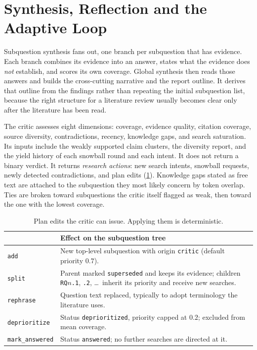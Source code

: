 \documentclass[10pt,a4paper]{article}
\newcommand{\hfont}{\sffamily}
\renewcommand{\paragraph}[1]{%
  \par\vspace{0.35em}{\hfont\bfseries\color{accent}#1}\hspace{0.6em}\ignorespaces}
\newcommand{\code}[1]{\texttt{#1}}
\newcommand{\headrow}{\rowcolor{tablehead}}
\newcommand{\tcol}[1]{{\hfont\bfseries\footnotesize\color{accent}#1}}
\begin{document}
\section{Synthesis, Reflection and the Adaptive Loop}
\label{sec:critic}

\paragraph{Synthesis.} Subquestion synthesis fans out, one branch per
subquestion that has evidence. Each branch combines its evidence into an
answer, states what the evidence does \emph{not} establish, and scores its
own coverage. Global synthesis then reads those answers and builds the
cross-cutting narrative and the report outline. It derives that outline
from the findings rather than repeating the initial subquestion list,
because the right structure for a literature review usually becomes clear
only after the literature has been read.

\paragraph{The critic.} The critic assesses eight dimensions: coverage,
evidence quality, citation coverage, source diversity, contradictions,
recency, knowledge gaps, and search saturation. Its inputs include the
weakly supported claim clusters, the diversity report, and the yield
history of each snowball round and each intent. It does not return a
binary verdict. It returns \emph{research actions}: new search intents,
snowball requests, newly detected contradictions, and plan edits
(\cref{tab:edits}). Knowledge gaps stated as free text are attached to the
subquestion they most likely concern by token overlap. Ties are broken
toward subquestions the critic itself flagged as weak, then toward the one
with the lowest coverage.

\begin{table}[t]
\centering
\small
\caption{Plan edits the critic can issue. Applying them is deterministic.}
\label{tab:edits}
\begin{tabularx}{\linewidth}{@{}lX@{}}
\toprule
\headrow \tcol{Edit} & \tcol{Effect on the subquestion tree} \\
\midrule
\code{add}           & New top-level subquestion with origin \code{critic} (default priority $0.7$). \\
\code{split}         & Parent marked \code{superseded} and keeps its evidence; children \code{RQ}$n$\code{.1}, \code{.2}, \ldots\ inherit its priority and receive new searches. \\
\code{rephrase}      & Question text replaced, typically to adopt terminology the literature uses. \\
\code{deprioritize}  & Status \code{deprioritized}, priority capped at $0.2$; excluded from mean coverage. \\
\code{mark\_answered}& Status \code{answered}; no further searches are directed at it. \\
\bottomrule
\end{tabularx}
\end{table}
\end{document}
